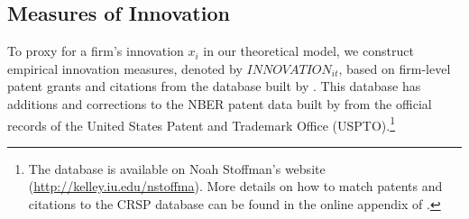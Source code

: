 \documentclass[12pt]{article}
\begin{document}
\subsection{Measures of Innovation}

To proxy for a firm's innovation $x_{i}$ in our theoretical model, we construct empirical innovation measures, denoted by $\mathit{INNOVATION}_{it}$, based on firm-level patent grants and citations from the database built by \cite{kogan2012technological}. This database has additions and corrections to the NBER patent data built by \cite{hall2001nber} from the official records of the United States Patent and Trademark Office (USPTO).\footnote{The database is available on Noah Stoffman’s website (\url{http://kelley.iu.edu/nstoffma}). More details on how to match patents and citations to the CRSP database can be found in the online appendix of \cite{kogan2012technological}.}
\end{document}

